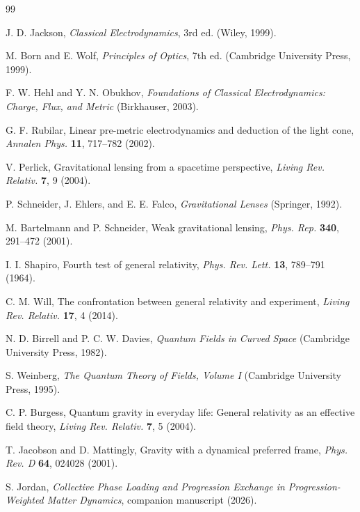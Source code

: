 \documentclass[12pt]{article}
\begin{document}
\begin{thebibliography}{99}

J. D. Jackson, \textit{Classical Electrodynamics}, 3rd ed. (Wiley, 1999).

M. Born and E. Wolf, \textit{Principles of Optics}, 7th ed. (Cambridge University Press, 1999).

F. W. Hehl and Y. N. Obukhov, \textit{Foundations of Classical Electrodynamics: Charge, Flux, and Metric} (Birkhauser, 2003).

G. F. Rubilar, Linear pre-metric electrodynamics and deduction of the light cone, \textit{Annalen Phys.} \textbf{11}, 717--782 (2002).

V. Perlick, Gravitational lensing from a spacetime perspective, \textit{Living Rev. Relativ.} \textbf{7}, 9 (2004).

P. Schneider, J. Ehlers, and E. E. Falco, \textit{Gravitational Lenses} (Springer, 1992).

M. Bartelmann and P. Schneider, Weak gravitational lensing, \textit{Phys. Rep.} \textbf{340}, 291--472 (2001).

I. I. Shapiro, Fourth test of general relativity, \textit{Phys. Rev. Lett.} \textbf{13}, 789--791 (1964).

C. M. Will, The confrontation between general relativity and experiment, \textit{Living Rev. Relativ.} \textbf{17}, 4 (2014).

N. D. Birrell and P. C. W. Davies, \textit{Quantum Fields in Curved Space} (Cambridge University Press, 1982).

S. Weinberg, \textit{The Quantum Theory of Fields, Volume I} (Cambridge University Press, 1995).

C. P. Burgess, Quantum gravity in everyday life: General relativity as an effective field theory, \textit{Living Rev. Relativ.} \textbf{7}, 5 (2004).

T. Jacobson and D. Mattingly, Gravity with a dynamical preferred frame, \textit{Phys. Rev. D} \textbf{64}, 024028 (2001).

S. Jordan, \textit{Collective Phase Loading and Progression Exchange in Progression-Weighted Matter Dynamics}, companion manuscript (2026).

\end{thebibliography}
\end{document}
